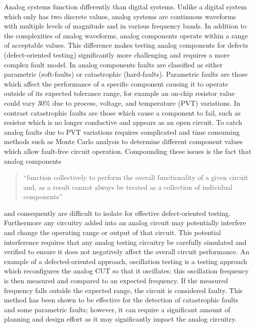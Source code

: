 \documentclass[12pt]{report}
\begin{document}
Analog systems function differently than digital systems.  Unlike a digital system which only has two discrete values, analog systems are continuous waveforms with multiple levels of magnitude and in various frequency bands\cite{syschip}.  In addition to the complexities of analog waveforms, analog components operate within a range of acceptable values\cite{syschip}.  This difference makes testing analog components for defects (defect-oriented testing) significantly more challenging and requires a more complex fault model.  In analog components faults are classified as either parametric (soft-faults) or catastrophic (hard-faults)\cite{analogfaults}.  Parametric faults are those which affect the performance of a specific component causing it to operate outside of its expected tolerance range, for example an on-chip resistor value could vary 30\% due to process, voltage, and temperature (PVT) variations.  In contrast catastrophic faults are those which cause a component to fail, such as resistor which is no longer conductive and appears as an open circuit\cite{analogfaults}.  To catch analog faults due to PVT variations requires complicated and time consuming methods such as Monte Carlo analysis to determine different component values which allow fault-free circuit operation\cite{syschip}.  Compounding these issues is the fact that analog components
\begin{quote}
``function collectively to perform the overall functionality of a given circuit and, as a result cannot always be treated as a collection of individual components\cite{syschip}''
\end{quote}
and consequently are difficult to isolate for effective defect-oriented testing\cite{analogmixedtest}.  Furthermore any circuitry added into an analog circuit may potentially interfere and change the operating range or output of that circuit\cite{syschip}.  This potential interference requires that any analog testing circuitry be carefully simulated and verified to ensure it does not negatively affect the overall circuit performance.  An example of a defected-oriented approach, oscillation testing is a testing approach which reconfigures the analog CUT so that it oscillates; this oscillation frequency is then measured and compared to an expected frequency.  If the measured frequency falls outside the expected range, the circuit is considered faulty\cite{analogosc}.  This method has been shown to be effective for the detection of catastrophic faults and some parametric faults; however, it can require a significant amount of planning and design effort as it may significantly impact the analog circuitry\cite{analogosc}\cite{syschip}.
\end{document}
